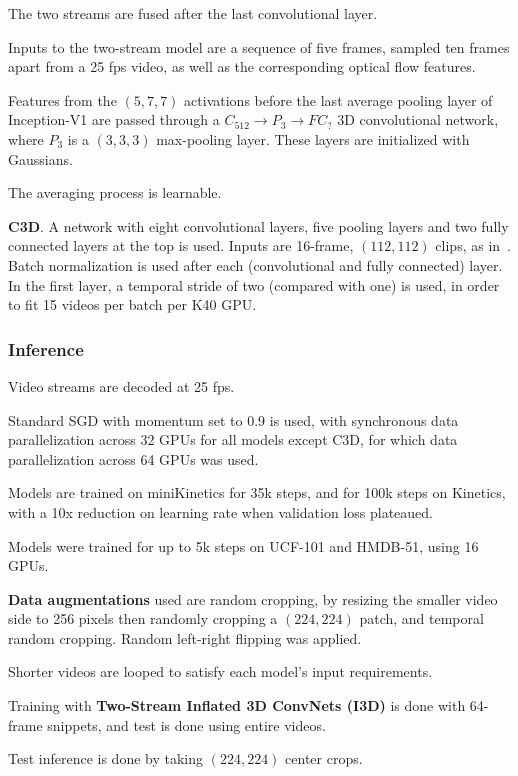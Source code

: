 \documentclass[a4paper, 12pt]{article}
\begin{document}
The two streams are fused after the last convolutional layer.

Inputs to the two-stream model are a sequence of five frames, sampled ten
frames apart from a 25 fps video, as well as the corresponding optical flow
features.

Features from the $(5, 7, 7)$ activations before the last average pooling layer
of Inception-V1 are passed through a $C_{512} \rightarrow P_3 \rightarrow FC_{?}$ 3D
convolutional network, where $P_3$ is a $(3, 3, 3)$ max-pooling layer. These
layers are initialized with Gaussians.

The averaging process is learnable.

\textbf{C3D}. A network with eight convolutional layers, five pooling layers
and two fully connected layers at the top is used. Inputs are 16-frame,
$(112, 112)$ clips, as in~\citet{DBLP:journals/corr/TranBFTP14}. Batch
normalization is used after each (convolutional and fully connected) layer. In
the first layer, a temporal stride of two (compared with one) is used, in order
to fit 15 videos per batch per K40 GPU\@.

\subsubsection{Inference}

Video streams are decoded at 25 fps.

Standard SGD with momentum set to 0.9 is used, with synchronous data
parallelization across 32 GPUs for all models except C3D, for which data
parallelization across 64 GPUs was used.

Models are trained on miniKinetics for 35k steps, and for 100k steps on
Kinetics, with a 10x reduction on learning rate when validation loss plateaued.

Models were trained for up to 5k steps on UCF-101 and HMDB-51, using 16 GPUs.

\textbf{Data augmentations} used are random cropping, by resizing the smaller
video side to 256 pixels then randomly cropping a $(224, 224)$ patch, and
temporal random cropping. Random left-right flipping was applied.

Shorter videos are looped to satisfy each model's input requirements.

Training with \textbf{Two-Stream Inflated 3D ConvNets (I3D)} is done with
64-frame snippets, and test is done using entire videos.

Test inference is done by taking $(224, 224)$ center crops.
\end{document}
